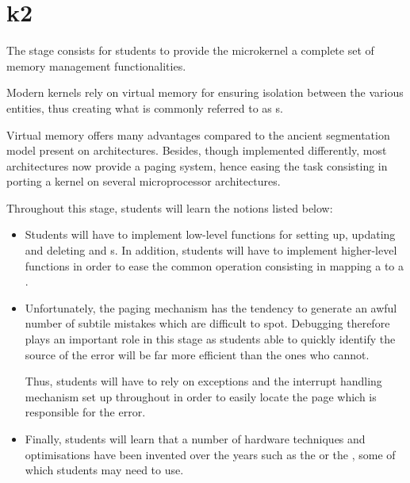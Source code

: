 %
%
%
%
%
%

%
%

\chapter{k2}
\label{chapter:k2}

The  stage consists for students to provide the microkernel a
complete set of memory management functionalities.

Modern kernels rely on virtual memory for ensuring isolation between the
various entities, thus creating what is commonly referred to as
s.

Virtual memory offers many advantages compared to the ancient segmentation
model present on  architectures. Besides, though implemented
differently, most architectures now provide a paging system, hence easing
the task consisting in porting a kernel on several microprocessor
architectures.

Throughout this stage, students will learn the notions listed below:

\begin{itemize}
  \item

    \-

    Students will have to implement low-level functions for setting up,
    updating and deleting  and
    s. In addition, students will have to
    implement higher-level functions in order to ease the common operation
    consisting in mapping a  to a .
  \item

    \-

    Unfortunately, the paging mechanism has the tendency to generate an
    awful number of subtile mistakes which are difficult to spot. Debugging
    therefore plays an important role in this stage as students able to
    quickly identify the source of the error will be far more efficient than
    the ones who cannot.

    \-

    Thus, students will have to rely on exceptions and the interrupt handling
    mechanism set up throughout  in order to easily locate the
    page which is responsible for the error.
  \item

    \-

    Finally, students will learn that a number of hardware techniques
    and optimisations have been invented over the years such as the
     or the , some of which
    students may need to use.
\end{itemize}


